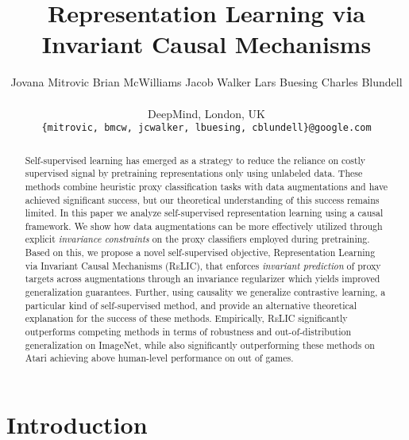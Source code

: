 \documentclass{article}
\title{Representation Learning via \\ Invariant Causal Mechanisms}
\author{Jovana Mitrovic
  \quad Brian McWilliams
  \quad Jacob Walker
  \quad Lars Buesing
  \quad Charles Blundell \\ \\
    \hspace{5cm} DeepMind, London, UK \\
    \hspace{0.6cm} \texttt{\{mitrovic, bmcw, jcwalker, lbuesing, cblundell\}@google.com} \\
}
\newcommand{\relic}{\textsc{ReLIC}}
\begin{document}
\maketitle

\begin{abstract}
Self-supervised learning has emerged as a strategy to reduce the reliance on costly supervised signal by pretraining representations only using unlabeled data.
These methods combine heuristic proxy classification tasks with data augmentations and have achieved significant success, but our theoretical understanding of this success remains limited.
In this paper we analyze self-supervised representation learning using a causal framework.
We show how data augmentations can be more effectively utilized through explicit \emph{invariance constraints} on the proxy classifiers employed during pretraining. 
Based on this, we propose a novel self-supervised objective, 
Representation Learning via Invariant Causal Mechanisms (\relic{}), that enforces \emph{invariant prediction} of proxy targets across augmentations through an invariance regularizer
which yields improved generalization guarantees.
Further, using causality we generalize contrastive learning, a particular kind of self-supervised method, and provide an alternative theoretical explanation for the success of these methods.
Empirically, \relic{} significantly outperforms competing methods in terms of robustness and out-of-distribution generalization on ImageNet, while also significantly outperforming these methods on Atari achieving above human-level performance on  out of  games. 
\end{abstract}

\section{Introduction}
\end{document}
